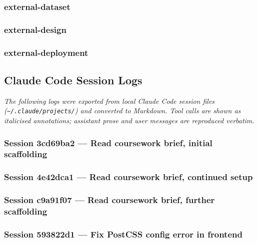\subsubsection*{external-dataset}


\subsubsection*{external-design}


\subsubsection*{external-deployment}


\subsection{Claude Code Session Logs}

\textit{The following logs were exported from local Claude Code session files
(\texttt{\textasciitilde/.claude/projects/}) and converted to Markdown.
Tool calls are shown as italicised annotations; assistant prose and user messages
are reproduced verbatim.}

\subsubsection*{Session 3cd69ba2 — Read coursework brief, initial scaffolding}


\subsubsection*{Session 4e42dca1 — Read coursework brief, continued setup}


\subsubsection*{Session c9a91f07 — Read coursework brief, further scaffolding}


\subsubsection*{Session 593822d1 — Fix PostCSS config error in frontend}


